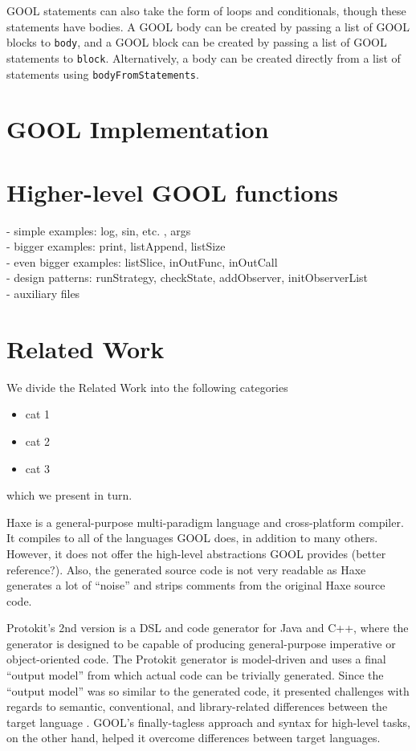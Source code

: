 \documentclass[sigplan,review,anonymous]{acmart}
\begin{document}
GOOL statements can also take the form of loops and conditionals, though these 
statements have bodies. A GOOL body can be created by passing a list of GOOL 
blocks to \verb|body|, and a GOOL block can be created by passing a list of 
GOOL statements to \verb|block|. Alternatively, a body can be created directly 
from a list of statements using \verb|bodyFromStatements|.
\section{GOOL Implementation} \label{implementation}
\section{Higher-level GOOL functions} \label{patterns}
- simple examples: log, sin, etc.  , args \\
- bigger examples: print, listAppend, listSize \\
- even bigger examples: listSlice, inOutFunc, inOutCall \\
- design patterns: runStrategy, checkState, addObserver, initObserverList \\
- auxiliary files
\section{Related Work} \label{related}

We divide the Related Work into the following categories
\begin{itemize}
\item cat 1
\item cat 2
\item cat 3
\end{itemize}
which we present in turn.

Haxe is a general-purpose multi-paradigm language and cross-platform compiler. 
It compiles to all of the languages GOOL does, in addition to many others. 
However, it does not offer the high-level abstractions GOOL provides 
\cite{Haxe} (better reference?). Also, the generated source code is not very 
readable as Haxe generates a lot of ``noise'' and strips comments from the 
original Haxe source code.

Protokit's 2nd version is a DSL and code generator for Java and C++, where the 
generator is designed to be capable of producing general-purpose imperative or 
object-oriented code. The Protokit generator is model-driven and uses a final 
``output model'' from which actual code can be trivially generated. Since the 
``output model'' was so similar to the generated code, it presented challenges 
with regards to semantic, conventional, and library-related differences between 
the target language \cite{kovesdan2017multi}. GOOL's finally-tagless approach 
and syntax for high-level tasks, on the other hand, helped it overcome 
differences between target languages.
\end{document}
